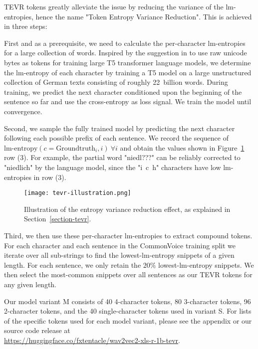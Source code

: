 TEVR tokens greatly alleviate the issue by reducing the variance of the lm-entropies, hence the name "Token Entropy Variance Reduction". This is achieved in three steps:

First and as a prerequisite, we need to calculate the per-character lm-entropies for a large collection of words. Inspired by the suggestion in \citet{byt5} to use raw unicode bytes as tokens for training large T5 \citep{origt5} transformer language models, we determine the lm-entropy of each character by training a T5 model on a large unstructured collection of German texts consisting of roughly 22~billion words. During training, we predict the next character conditioned upon the beginning of the sentence so far and use the cross-entropy as loss signal. We train the model until convergence.

Second, we sample the fully trained model by predicting the next character following each possible prefix of each sentence. We record the sequence of $ \text{lm-entropy}(c=\text{Groundtruth}_i,i)\ \forall i $ and obtain the values shown in Figure~\ref{figure-tevr} row (3). For example, the partial word "niedl???" can be reliably corrected to "niedlich" by the language model, since the "i~c~h" characters have low lm-entropies in row (3).

\begin{figure}[h]
\begin{center}
\texttt{[image: tevr-illustration.png]}
\end{center}
\caption{Illustration of the entropy variance reduction effect, as explained in Section~\ref{section-tevr}. }
\label{figure-tevr}
\end{figure}

Third, we then use these per-character lm-entropies to extract compound tokens. For each character and each sentence in the CommonVoice training split we iterate over all sub-strings to find the lowest-lm-entropy snippets of a given length. For each sentence, we only retain the $20\%$ lowest-lm-entropy snippets. We then select the most-common snippets over all sentences as our TEVR tokens for any given length. 

Our model variant M consists of 40 4-character tokens, 80 3-character tokens, 96 2-character tokens, and the 40 single-character tokens used in variant S.
For lists of the specific tokens used for each model variant, please see the appendix or our source code release at\\
\url{https://huggingface.co/fxtentacle/wav2vec2-xls-r-1b-tevr}.

